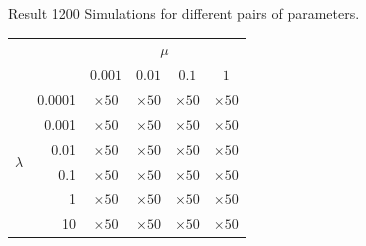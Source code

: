 \documentclass[12pt, notes=show]{beamer}
\begin{document}
\begin{frame}{Result}
    1200 Simulations for different pairs of parameters.
    \begin{table}
	\centering

	\begin{tabular}{rr|cccc}
	    & &\multicolumn{4}{c}{ $\mu$ } \\
	    & & $0.001$ & $0.01$ & $0.1$ & $1$ \\ \hline
	    \multirow{6}{*}{$\lambda$} 
	    & 0.0001	& $\times50$ & $\times50$ & $\times50$ & $\times50$ \\
	    & 0.001	& $\times50$ & $\times50$ & $\times50$ & $\times50$ \\
	    & 0.01	& $\times50$ & $\times50$ & $\times50$ & $\times50$ \\
	    & 0.1	& $\times50$ & $\times50$ & $\times50$ & $\times50$ \\
	    & 1		& $\times50$ & $\times50$ & $\times50$ & $\times50$ \\
	    & 10	& $\times50$ & $\times50$ & $\times50$ & $\times50$ 
	\end{tabular}
    \end{table}

\end{frame}
\end{document}
